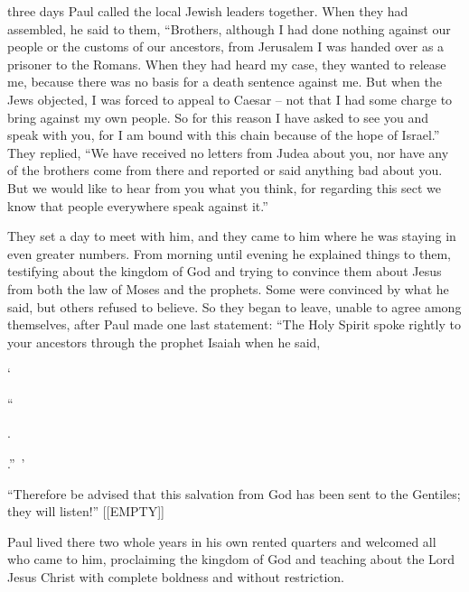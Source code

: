 {three
days
Paul
called
the local Jewish
leaders
together.
When
they
had assembled,
he said
to
them,
“Brothers,
although
I
had done
nothing
against our people
or
the
customs
of our ancestors,
from
Jerusalem
I was handed over
as a prisoner
to
the Romans.
When they had heard
my
case,
they wanted
to release
me, because
there was no
basis
for a death
sentence
against
me.
But
when the Jews
objected,
I was forced
to appeal
to Caesar –
not
that I had
some
charge
to bring against my own
people.
So
for
this reason
I have asked
to see
you
and
speak
with you, for
I am bound
with this
chain
because of
the hope
of Israel.”
They
replied, “We
have received
no
letters
from
Judea
about
you,
nor
have any
of the brothers
come
from there and reported
or
said
anything
bad
about
you.
But
we would like
to hear
from
you
what
you think,
for
regarding
this
sect
we
know
that
people everywhere
speak against it.”
\par }{\PP {}They set
a day
to meet with him,
and they came
to
him
where he was staying
in
even greater numbers.
From
morning
until
evening
he explained
things to them, testifying
about the kingdom
of God
and trying to convince
them
about
Jesus
from
both
the law
of Moses
and
the prophets.
Some were convinced
by what he said,
but
others refused to believe.
So
they began to leave,
unable
to agree among
themselves,
after Paul
made
one
last statement: “The Holy
Spirit
spoke
rightly
to
your
ancestors
through
the prophet
Isaiah
when he said,
\par }{\Q ‘{}
\par }{\Q “{}
\par }{.
\par }{\Q {}
\par }{
\par }{
\par }{
\par }{
\par }{
\par }{.” ’
\par }{\PP {}“Therefore
be
advised
that
this
salvation
from God
has been sent
to the Gentiles;
they will listen!”
[[EMPTY]]
\par }{\PP {}Paul lived
there two
whole
years
in
his own
rented quarters
and
welcomed
all
who came
to
him,
proclaiming
the kingdom
of God
and
teaching
about
the Lord
Jesus
Christ
with
complete
boldness
and without restriction.
\par }